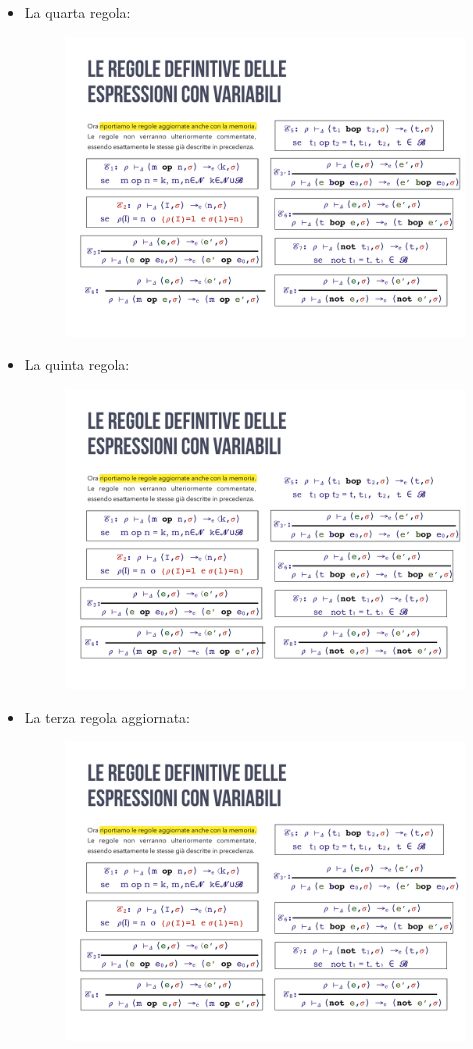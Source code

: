 \documentclass[a4paper]{article}
\begin{document}
\begin{itemize}
 		\item La quarta regola:
 		\begin{figure}[!htp]
 			\centering
 			\includegraphics[width=.7\textwidth]{img/regola_espressione-up-4.pdf}
 		\end{figure}
 		
 		\item La quinta regola:
 		\begin{figure}[!htp]
 			\centering
 			\includegraphics[width=.7\textwidth]{img/regola_espressione-up-5.pdf}
 		\end{figure}
 		
 		\item La terza regola aggiornata:
 		\begin{figure}[!htp]
 			\centering
 			\includegraphics[width=.7\textwidth]{img/regola_espressione-up-3b.pdf}
 		\end{figure}\newpage
 		

\end{itemize}
\end{document}
